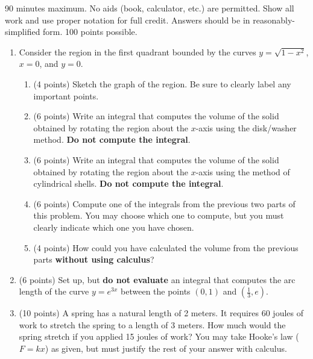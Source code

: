 \documentclass[12pt]{article}
\newcommand{\ds}{\displaystyle}
\begin{document}
90 minutes maximum.  No aids (book, calculator, etc.) are permitted.
Show all work and use proper notation for full credit.  Answers should
be in reasonably-simplified form.  100 points possible.

\begin{enumerate}

\item Consider the region in the first quadrant bounded by the curves
  $\ds y = \sqrt{1-x^2}$, $x=0$, and $y=0$.
  \begin{enumerate}
  \item (4 points) Sketch the graph of the region. Be sure to clearly label 
    any important points.
    \vfill
    
  \item (6 points) Write an integral that computes the volume of the solid
    obtained by rotating the region about the $x$-axis using the
    disk/washer method. {\bf Do not compute the integral}.
    \vspace{4cm}
    
  \item (6 points) Write an integral that computes the volume of the solid
    obtained by rotating the region about the $x$-axis using the method of
    cylindrical shells. {\bf Do not compute the integral}.
    \vspace{4cm}

    \newpage
    
  \item (6 points) Compute one of the integrals from the previous two parts of
    this problem. You may choose which one to compute, but you must
    clearly indicate which one you have chosen.
    \vfill
    \vfill
    
  \item (4 points) How could you have calculated the volume from the previous
    parts {\bf without using calculus}?
    \vfill

  \end{enumerate}


\item (6 points) Set up, but {\bf do not evaluate} an integral that computes the
  arc length of the curve $\ds y=e^{3x}$ between the points $\ds (0,1)$
  and $\left( \frac{1}{3}, e \right)$.
  \vfill
  \newpage

\item (10 points) A spring has a natural length of 2 meters. It requires 60 joules
  of work to stretch the spring to a length of 3 meters. How much would
  the spring stretch if you applied 15 joules of work? You
  may take Hooke's law ($F=kx$) as given, but must justify the rest of
  your answer with calculus.
  \vfill


\end{enumerate}
\end{document}
